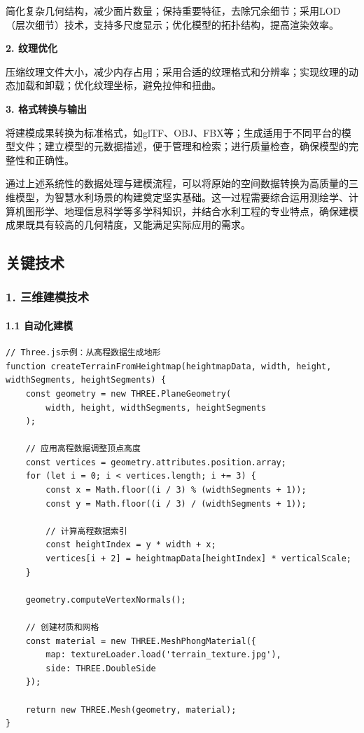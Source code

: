 简化复杂几何结构，减少面片数量；保持重要特征，去除冗余细节；采用LOD（层次细节）技术，支持多尺度显示；优化模型的拓扑结构，提高渲染效率。

\textbf{2. 纹理优化}

压缩纹理文件大小，减少内存占用；采用合适的纹理格式和分辨率；实现纹理的动态加载和卸载；优化纹理坐标，避免拉伸和扭曲。

\textbf{3. 格式转换与输出}

将建模成果转换为标准格式，如glTF、OBJ、FBX等；生成适用于不同平台的模型文件；建立模型的元数据描述，便于管理和检索；进行质量检查，确保模型的完整性和正确性。

通过上述系统性的数据处理与建模流程，可以将原始的空间数据转换为高质量的三维模型，为智慧水利场景的构建奠定坚实基础。这一过程需要综合运用测绘学、计算机图形学、地理信息科学等多学科知识，并结合水利工程的专业特点，确保建模成果既具有较高的几何精度，又能满足实际应用的需求。

\subsection{关键技术}\label{ux5173ux952eux6280ux672f}

\subsubsection{1.
三维建模技术}\label{ux4e09ux7ef4ux5efaux6a21ux6280ux672f}

\paragraph{1.1 自动化建模}\label{ux81eaux52a8ux5316ux5efaux6a21}

\begin{lstlisting}
// Three.js示例：从高程数据生成地形
function createTerrainFromHeightmap(heightmapData, width, height, widthSegments, heightSegments) {
    const geometry = new THREE.PlaneGeometry(
        width, height, widthSegments, heightSegments
    );
    
    // 应用高程数据调整顶点高度
    const vertices = geometry.attributes.position.array;
    for (let i = 0; i < vertices.length; i += 3) {
        const x = Math.floor((i / 3) % (widthSegments + 1));
        const y = Math.floor((i / 3) / (widthSegments + 1));
        
        // 计算高程数据索引
        const heightIndex = y * width + x;
        vertices[i + 2] = heightmapData[heightIndex] * verticalScale;
    }
    
    geometry.computeVertexNormals();
    
    // 创建材质和网格
    const material = new THREE.MeshPhongMaterial({
        map: textureLoader.load('terrain_texture.jpg'),
        side: THREE.DoubleSide
    });
    
    return new THREE.Mesh(geometry, material);
}
\end{lstlisting}

